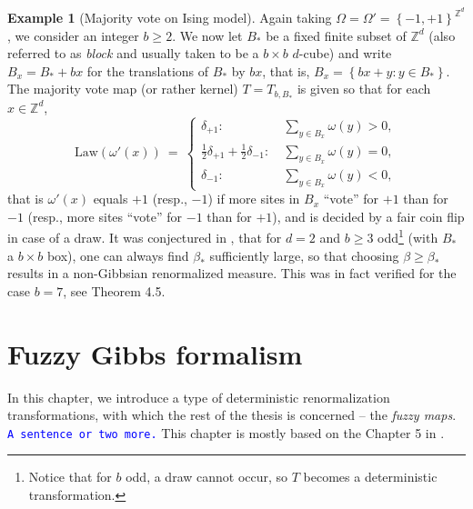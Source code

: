 \documentclass[12pt]{article}
\newcommand{\Z}{\mathbb{Z}}
\newcommand{\set}[1]{\left\{#1\right\}}
\newcommand{\1}{\mathbbm{1}}
\newcommand{\5}{\vspace{0.5cm}}
\theoremstyle{definition}
\newtheorem{ex}[thm]{Example}
\begin{document}
\begin{ex}[Majority vote on Ising model]
Again taking $\Omega=\Omega'=\set{-1,+1}^{\Z^d}$, we consider an integer $b\geq 2$. We now let $B_*$ be a fixed finite subset of $\Z^d$ (also referred to as \textit{block} and usually taken to be a $b\times b$ $d$-cube) and write $B_x=B_*+bx$ for the translations of $B_*$ by $bx$, that is, $B_x=\set{bx+y:y\in B_*}$. The majority vote map (or rather kernel) $T=T_{b,B_*}$ is given so that for each $x\in\Z^d$,
$$\mathrm{Law}(\omega'(x)) ~=~ \begin{cases}
\delta_{+1}: ~&\sum_{y\in B_x}\omega(y)>0, \\
\frac{1}{2}\delta_{+1}+\frac{1}{2}\delta_{-1}: ~&\sum_{y\in B_x}\omega(y)=0, \\
\delta_{-1}: ~&\sum_{y\in B_x}\omega(y)<0,
\end{cases}$$
that is $\omega'(x)$ equals $+1$ (resp., $-1$) if more sites in $B_x$ ``vote'' for $+1$ than for $-1$ (resp., more sites ``vote'' for $-1$ than for $+1$), and is decided by a fair coin flip in case of a draw. It was conjectured in \cite{EFS}, that for $d=2$ and $b\geq 3$ odd\footnote{Notice that for $b$ odd, a draw cannot occur, so $T$ becomes a deterministic transformation.} (with $B_*$ a $b\times b$ box), one can always find $\beta_*$ sufficiently large, so that choosing $\beta\geq\beta_*$ results in a non-Gibbsian renormalized measure. This was in fact verified for the case $b=7$, see Theorem 4.5. 
\end{ex}


\pagebreak


\section{Fuzzy Gibbs formalism}\label{ch:2}

In this chapter, we introduce a type of deterministic renormalization transformations, with which the rest of the thesis is concerned -- the \textit{fuzzy maps}. \textcolor{blue}{\texttt{A sentence or two more.}} This chapter is mostly based on the Chapter 5 in \cite{Ber}.
\end{document}
